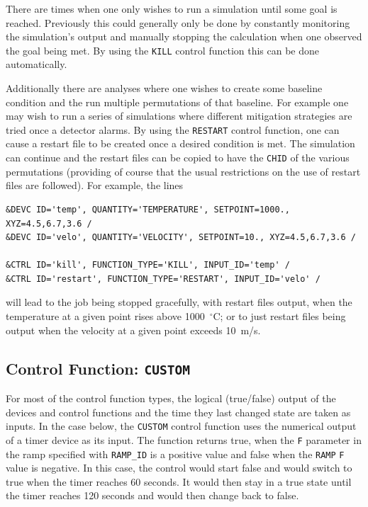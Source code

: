 \documentclass[11pt]{book}
\newcommand{\ct}{\tt\small}
\begin{document}
There are times when one only wishes to run a simulation until some
goal is reached.  Previously this could generally only be done by
constantly monitoring the simulation's output and manually stopping
the calculation when one observed  the goal being met.  By using the
{\ct KILL} control function this can be done automatically.

Additionally there are analyses where one wishes to create some
baseline condition and the run multiple permutations of that baseline.
For example one may wish to run a series of simulations where
different mitigation strategies are tried once a detector alarms.  By
using the {\ct RESTART} 
control function, one can cause a restart file
to be created once a desired condition is met.  The simulation can
continue and the restart files can be copied to have the {\ct CHID} of
the various permutations (providing of course that the usual
restrictions on the use of restart files are followed).
For example, the lines

\footnotesize
\begin{verbatim}
&DEVC ID='temp', QUANTITY='TEMPERATURE', SETPOINT=1000., XYZ=4.5,6.7,3.6 /
&DEVC ID='velo', QUANTITY='VELOCITY', SETPOINT=10., XYZ=4.5,6.7,3.6 /

&CTRL ID='kill', FUNCTION_TYPE='KILL', INPUT_ID='temp' /
&CTRL ID='restart', FUNCTION_TYPE='RESTART', INPUT_ID='velo' /
\end{verbatim} \normalsize

\noindent
will lead to the job being stopped gracefully, with restart files output, when the temperature at a given point rises above
1000~$^\circ$C; or to just restart files being output when the velocity at a given point exceeds 10~m/s.



\subsection{Control Function: \texorpdfstring{{\tt CUSTOM}}{CUSTOM} }

For most of the control function types, the logical (true/false) output of
the devices and control functions and the time they last changed
state are taken as inputs.  In the case below, the {\ct CUSTOM} 
control function uses the numerical output of a timer device as its input.  The function returns true, when the {\ct F} parameter
in the ramp specified with {\ct RAMP\_ID} is a positive value and
false when the {\ct RAMP} {\ct F} value is negative.
In this case, the control would start false and would switch to
true when the timer reaches 60 seconds.  It would then stay in a true
state until the timer reaches 120 seconds and would then change back to false.
\end{document}
